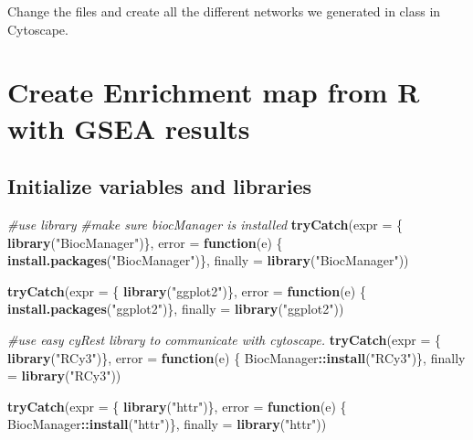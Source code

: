 \documentclass[
]{book}
\newenvironment{Shaded}{\begin{snugshade}}{\end{snugshade}}
\newcommand{\AttributeTok}[1]{\textcolor[rgb]{0.13,0.29,0.53}{#1}}
\newcommand{\CommentTok}[1]{\textcolor[rgb]{0.56,0.35,0.01}{\textit{#1}}}
\newcommand{\ControlFlowTok}[1]{\textcolor[rgb]{0.13,0.29,0.53}{\textbf{#1}}}
\newcommand{\FunctionTok}[1]{\textcolor[rgb]{0.13,0.29,0.53}{\textbf{#1}}}
\newcommand{\NormalTok}[1]{#1}
\newcommand{\SpecialCharTok}[1]{\textcolor[rgb]{0.81,0.36,0.00}{\textbf{#1}}}
\newcommand{\StringTok}[1]{\textcolor[rgb]{0.31,0.60,0.02}{#1}}
\begin{document}
Change the files and create all the different networks we generated in class in Cytoscape.

\chapter{Create Enrichment map from R with GSEA results}\label{create-enrichment-map-from-r-with-gsea-results}

\section{Initialize variables and libraries}\label{initialize-variables-and-libraries-2}

\begin{Shaded}
\begin{Highlighting}[]
\CommentTok{\#use library}
\CommentTok{\#make sure biocManager is installed}
\FunctionTok{tryCatch}\NormalTok{(}\AttributeTok{expr =}\NormalTok{ \{ }\FunctionTok{library}\NormalTok{(}\StringTok{"BiocManager"}\NormalTok{)\}, }
         \AttributeTok{error =} \ControlFlowTok{function}\NormalTok{(e) \{ }
           \FunctionTok{install.packages}\NormalTok{(}\StringTok{"BiocManager"}\NormalTok{)\}, }
         \AttributeTok{finally =} \FunctionTok{library}\NormalTok{(}\StringTok{"BiocManager"}\NormalTok{))}

\FunctionTok{tryCatch}\NormalTok{(}\AttributeTok{expr =}\NormalTok{ \{ }\FunctionTok{library}\NormalTok{(}\StringTok{"ggplot2"}\NormalTok{)\}, }
         \AttributeTok{error =} \ControlFlowTok{function}\NormalTok{(e) \{ }\FunctionTok{install.packages}\NormalTok{(}\StringTok{"ggplot2"}\NormalTok{)\}, }
         \AttributeTok{finally =} \FunctionTok{library}\NormalTok{(}\StringTok{"ggplot2"}\NormalTok{))}

\CommentTok{\#use easy cyRest library to communicate with cytoscape.}
\FunctionTok{tryCatch}\NormalTok{(}\AttributeTok{expr =}\NormalTok{ \{ }\FunctionTok{library}\NormalTok{(}\StringTok{"RCy3"}\NormalTok{)\}, }
         \AttributeTok{error =} \ControlFlowTok{function}\NormalTok{(e) \{ BiocManager}\SpecialCharTok{::}\FunctionTok{install}\NormalTok{(}\StringTok{"RCy3"}\NormalTok{)\}, }
         \AttributeTok{finally =} \FunctionTok{library}\NormalTok{(}\StringTok{"RCy3"}\NormalTok{))}

\FunctionTok{tryCatch}\NormalTok{(}\AttributeTok{expr =}\NormalTok{ \{ }\FunctionTok{library}\NormalTok{(}\StringTok{"httr"}\NormalTok{)\}, }
         \AttributeTok{error =} \ControlFlowTok{function}\NormalTok{(e) \{ BiocManager}\SpecialCharTok{::}\FunctionTok{install}\NormalTok{(}\StringTok{"httr"}\NormalTok{)\}, }
         \AttributeTok{finally =} \FunctionTok{library}\NormalTok{(}\StringTok{"httr"}\NormalTok{))}
\end{Highlighting}
\end{Shaded}
\end{document}
